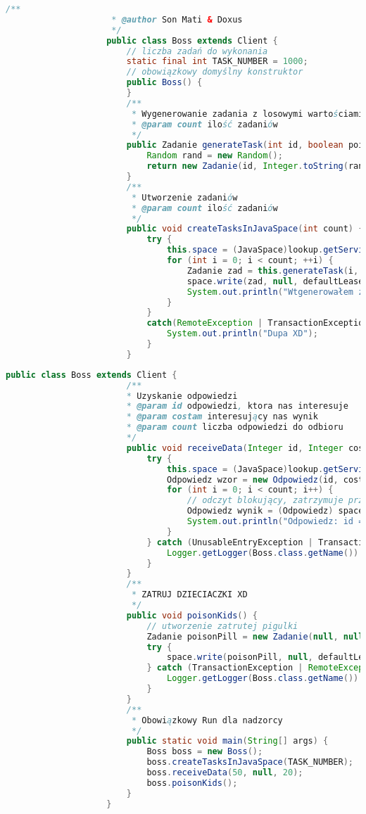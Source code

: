 			\begin{lstlisting}[language=Java]
					/**
					 * @author Son Mati & Doxus
					 */
					public class Boss extends Client {
						// liczba zadań do wykonania
						static final int TASK_NUMBER = 1000;
						// obowiązkowy domyślny konstruktor
						public Boss() {
						}
						/**
						 * Wygenerowanie zadania z losowymi wartościami
						 * @param count ilość zadaniów
						 */
						public Zadanie generateTask(int id, boolean poisonPill) {
							Random rand = new Random();
							return new Zadanie(id, Integer.toString(rand.nextInt(1000)), Integer.toString(rand.nextInt(1000)), poisonPill);
						}
						/**
						 * Utworzenie zadaniów
						 * @param count ilość zadaniów
						 */
						public void createTasksInJavaSpace(int count) {
							try {
								this.space = (JavaSpace)lookup.getService();
								for (int i = 0; i < count; ++i) {
									Zadanie zad = this.generateTask(i, false);
									space.write(zad, null, defaultLease);
									System.out.println("Wtgenerowałem zad " + i + " o stringach " + zad.napis1 + " i " + zad.napis2);
								}
							}
							catch(RemoteException | TransactionException ex) {
								System.out.println("Dupa XD");
							}
						}
			\end{lstlisting}
			\newpage
			\begin{lstlisting}[language=Java]
					public class Boss extends Client {
						/**
						* Uzyskanie odpowiedzi
						* @param id odpowiedzi, ktora nas interesuje
						* @param costam interesujący nas wynik
						* @param count liczba odpowiedzi do odbioru
						*/
						public void receiveData(Integer id, Integer costam, Integer count) {
							try {
								this.space = (JavaSpace)lookup.getService();
								Odpowiedz wzor = new Odpowiedz(id, costam);
								for (int i = 0; i < count; i++) {
									// odczyt blokujący, zatrzymuje przepływ dopóki odp się nie pojawi
									Odpowiedz wynik = (Odpowiedz) space.take(wzor, null, defaultLease);
									System.out.println("Odpowiedz: id = " + wynik.getId() + ", wynik = " + wynik.getWynik());
								}
							} catch (UnusableEntryException | TransactionException | InterruptedException | RemoteException ex) {
								Logger.getLogger(Boss.class.getName()).log(Level.SEVERE, null, ex);
							}
						}
						/**
						 * ZATRUJ DZIECIACZKI XD
						 */
						public void poisonKids() {
							// utworzenie zatrutej pigulki
							Zadanie poisonPill = new Zadanie(null, null, null, true);
							try {
								space.write(poisonPill, null, defaultLease);
							} catch (TransactionException | RemoteException ex) {
								Logger.getLogger(Boss.class.getName()).log(Level.SEVERE, null, ex);
							}
						}
						/**
						 * Obowiązkowy Run dla nadzorcy
						 */
						public static void main(String[] args) {
							Boss boss = new Boss();
							boss.createTasksInJavaSpace(TASK_NUMBER);
							boss.receiveData(50, null, 20);
							boss.poisonKids();
						}
					}
			\end{lstlisting}
